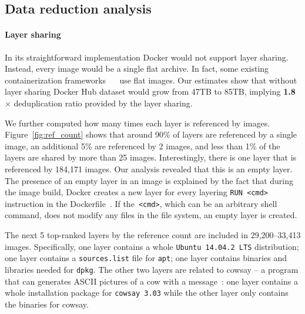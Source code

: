 \subsection{Data reduction analysis} 
\label{sec:dedup_ratio}

\paragraph{Layer sharing}

In its  straightforward implementation Docker would not support layer sharing.
%
Instead, every image would be a single flat archive.
%
In fact, some existing containerization frameworks
~\cite{openvz}~\cite{singularity}
%
use flat images.
%
Our estimates show that without layer sharing Docker Hub dataset would grow
from 47TB to 85TB, implying \textbf{1.8$\times$} deduplication ratio provided
by the layer sharing.
 
We further computed how many times each layer is referenced by images.
%
Figure~\ref{fig:ref_count} shows that around 90\% of layers are referenced by
a single image, an additional 5\% are referenced by 2 images, and less than
1\% of the layers are shared by more than 25 images.
%
Interestingly, there is one layer that is referenced by 184,171 images.  Our
analysis revealed that this is an empty layer.
%
The presence of an empty layer in an image is explained
by the fact that during the image build, Docker creates a new layer
for every layering \texttt{RUN <cmd>} instruction
in the Dockerfile~\cite{Dockerfile}.
%
If the~\texttt{<cmd>}, which can be an arbitrary shell command,
does not modify any files in the file system,
an empty layer is created.
%

The next 5 top-ranked layers by the reference count
are included in 29,200--33,413 images.
Specifically, one layer contains a whole \texttt{Ubuntu 14.04.2 LTS} distribution; 
one layer contains a \texttt{sources.list} file for \texttt{apt};
one layer contains binaries and libraries needed for \texttt{dpkg}.
The other two layers are related to cowsay -- a program that can generates ASCII pictures of a cow with a message~\cite{cowsay}:
one layer contains a whole installation package for \texttt{cowsay 3.03} 
while the other layer only contains the binaries for cowsay.
 
